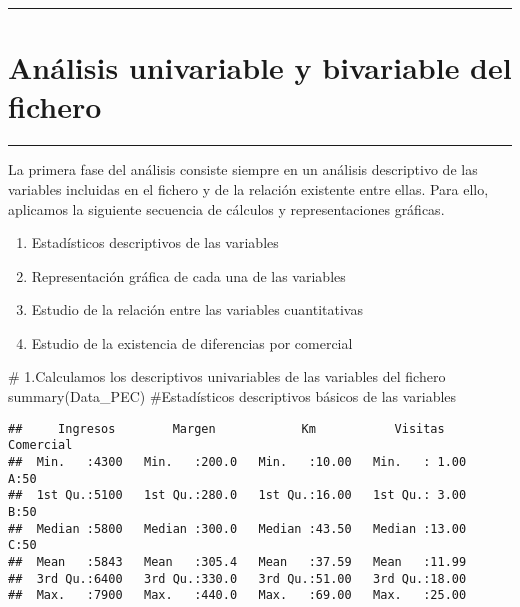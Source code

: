 \documentclass[]{article}
\newenvironment{Shaded}{\begin{snugshade}}{\end{snugshade}}
\newcommand{\KeywordTok}[1]{\textcolor[rgb]{0.94,0.87,0.69}{#1}}
\newcommand{\CommentTok}[1]{\textcolor[rgb]{0.50,0.62,0.50}{#1}}
\newcommand{\NormalTok}[1]{\textcolor[rgb]{0.80,0.80,0.80}{#1}}
\providecommand{\tightlist}{%
  \setlength{\itemsep}{0pt}\setlength{\parskip}{0pt}}
\begin{document}
\begin{center}\rule{0.5\linewidth}{\linethickness}\end{center}

\section{Análisis univariable y bivariable del
fichero}\label{analisis-univariable-y-bivariable-del-fichero}

\begin{center}\rule{0.5\linewidth}{\linethickness}\end{center}

La primera fase del análisis consiste siempre en un análisis descriptivo
de las variables incluidas en el fichero y de la relación existente
entre ellas. Para ello, aplicamos la siguiente secuencia de cálculos y
representaciones gráficas.

\begin{enumerate}
\def\labelenumi{\arabic{enumi}.}
\tightlist
\item
  Estadísticos descriptivos de las variables
\item
  Representación gráfica de cada una de las variables
\item
  Estudio de la relación entre las variables cuantitativas
\item
  Estudio de la existencia de diferencias por comercial
\end{enumerate}

\begin{Shaded}
\begin{Highlighting}[]
\CommentTok{# 1.Calculamos los descriptivos univariables de las variables del fichero}
\KeywordTok{summary}\NormalTok{(Data_PEC) }\CommentTok{#Estadísticos descriptivos básicos de las variables}
\end{Highlighting}
\end{Shaded}

\begin{verbatim}
##     Ingresos        Margen            Km           Visitas      Comercial
##  Min.   :4300   Min.   :200.0   Min.   :10.00   Min.   : 1.00   A:50     
##  1st Qu.:5100   1st Qu.:280.0   1st Qu.:16.00   1st Qu.: 3.00   B:50     
##  Median :5800   Median :300.0   Median :43.50   Median :13.00   C:50     
##  Mean   :5843   Mean   :305.4   Mean   :37.59   Mean   :11.99            
##  3rd Qu.:6400   3rd Qu.:330.0   3rd Qu.:51.00   3rd Qu.:18.00            
##  Max.   :7900   Max.   :440.0   Max.   :69.00   Max.   :25.00
\end{verbatim}
\end{document}
